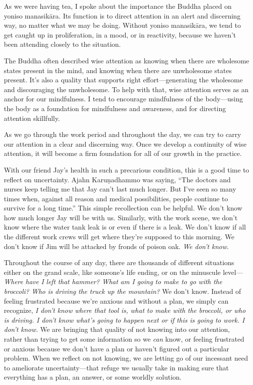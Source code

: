 As we were having tea, I spoke about the importance the Buddha placed 
on yoniso manasikāra. Its function is to direct attention in an alert 
and discerning way, no matter what we may be doing. Without yoniso 
manasikāra, we tend to get caught up in proliferation, in a mood, or 
in reactivity, because we haven't been attending closely to the 
situation.

The Buddha often described wise attention as knowing when there are 
wholesome states present in the mind, and knowing when there are 
unwholesome states present. It's also a quality that supports right 
effort---generating the wholesome and discouraging the unwholesome. To 
help with that, wise attention serves as an anchor for our mindfulness. 
I tend to encourage mindfulness of the body---using the body as a 
foundation for mindfulness and awareness, and for directing attention 
skillfully.

As we go through the work period and throughout the day, we can try to 
carry our attention in a clear and discerning way. Once we develop a 
continuity of wise attention, it will become a firm foundation for all 
of our growth in the practice.


With our friend Jay's health in such a precarious condition, this is a 
good time to reflect on uncertainty. Ajahn Karuṇadhammo was saying, 
``The doctors and nurses keep telling me that Jay can't last much 
longer. But I've seen so many times when, against all reason and 
medical possibilities, people continue to survive for a long time.'' 
This simple recollection can be helpful. We don't know how much longer 
Jay will be with us. Similarly, with the work scene, we don't know 
where the water tank leak is or even if there is a leak. We don't know 
if all the different work crews will get where they're supposed to this 
morning. We don't know if Jim will be attacked by fronds of poison oak. 
\emph{We don't know.}

Throughout the course of any day, there are thousands of different 
situations either on the grand scale, like someone's life ending, or on 
the minuscule level---\emph{Where have I left that hammer? What am I 
going to make to go with the broccoli? Who is driving the truck up the 
mountain?} We don't know. Instead of feeling frustrated because we're 
anxious and without a plan, we simply can recognize, \emph{I don't know 
where that tool is, what to make with the broccoli, or who is driving. 
I don't know what's going to happen next or if this is going to work. I 
don't know.} We are bringing that quality of not knowing into our 
attention, rather than trying to get some information so we \emph{can} 
know, or feeling frustrated or anxious because we don't have a plan or 
haven't figured out a particular problem. When we reflect on not 
knowing, we are letting go of our incessant need to ameliorate 
uncertainty---that refuge we usually take in making sure that 
everything has a plan, an answer, or some worldly solution.

